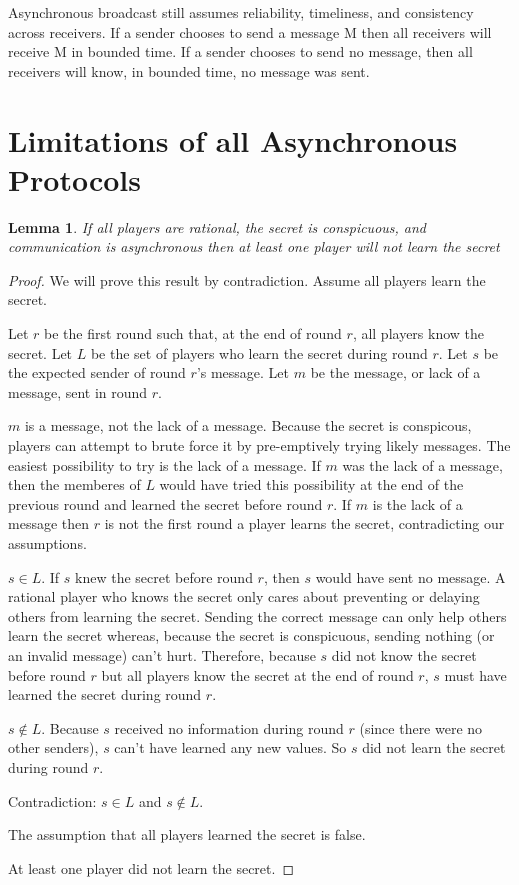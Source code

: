 \documentclass{dalcsthesis}
\newtheorem{lemma}{Lemma}
\begin{document}
Asynchronous broadcast still assumes reliability, timeliness, and consistency across receivers. If a sender chooses to send a message M then all receivers will receive M in bounded time. If a sender chooses to send no message, then all receivers will know, in bounded time, no message was sent. 

\section{Limitations of all Asynchronous Protocols}

\begin{lemma} If all players are rational, the secret is conspicuous, and communication is asynchronous then at least one player will not learn the secret \end{lemma}
\begin{proof}
We will prove this result by contradiction. Assume all players learn the secret.

Let $r$ be the first round such that, at the end of round $r$, all players know the secret. Let $L$ be the set of players who learn the secret during round $r$. Let $s$ be the expected sender of round $r$'s message. Let $m$ be the message, or lack of a message, sent in round $r$.

$m$ is a message, not the lack of a message. Because the secret is conspicous, players can attempt to brute force it by pre-emptively trying likely messages. The easiest possibility to try is the lack of a message. If $m$ was the lack of a message, then the memberes of $L$ would have tried this possibility at the end of the previous round and learned the secret before round $r$. If $m$ is the lack of a message then $r$ is not the first round a player learns the secret, contradicting our assumptions.

$s \in L$. If $s$ knew the secret before round $r$, then $s$ would have sent no message. A rational player who knows the secret only cares about preventing or delaying others from learning the secret. Sending the correct message can only help others learn the secret whereas, because the secret is conspicuous, sending nothing (or an invalid message) can't hurt. Therefore, because $s$ did not know the secret before round $r$ but all players know the secret at the end of round $r$, $s$ must have learned the secret during round $r$.

$s \notin L$. Because $s$ received no information during round $r$ (since there were no other senders), $s$ can't have learned any new values. So $s$ did not learn the secret during round $r$.

Contradiction: $s \in L$ and $s \notin L$.

The assumption that all players learned the secret is false.

At least one player did not learn the secret.
\end{proof}
\end{document}
